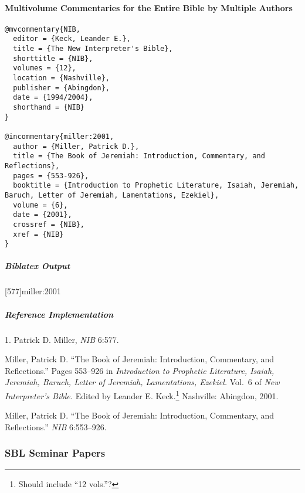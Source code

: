 \documentclass[a4paper]{article}
\newenvironment{biboutput}{%
  \subparagraph{Biblatex Output}
}{\color{black}}
\newenvironment{refimp}{%
  \subparagraph{Reference Implementation}
  \color{reference-colour}
  \rm
}{\par\color{black}}
\begin{document}
\paragraph{Multivolume Commentaries for the Entire Bible by Multiple Authors}

\begin{lstlisting}
@mvcommentary{NIB,
  editor = {Keck, Leander E.},
  title = {The New Interpreter's Bible},
  shorttitle = {NIB},
  volumes = {12},
  location = {Nashville},
  publisher = {Abingdon},
  date = {1994/2004},
  shorthand = {NIB}
}

@incommentary{miller:2001,
  author = {Miller, Patrick D.},
  title = {The Book of Jeremiah: Introduction, Commentary, and Reflections},
  pages = {553-926},
  booktitle = {Introduction to Prophetic Literature, Isaiah, Jeremiah, Baruch, Letter of Jeremiah, Lamentations, Ezekiel},
  volume = {6},
  date = {2001},
  crossref = {NIB},
  xref = {NIB}
}
\end{lstlisting}

\begin{biboutput}
  [577]{miller:2001}
  \toggletrue{fullbibrefs}
  \togglefalse{fullbibrefs}
\end{biboutput}

\begin{refimp}
  \hspace*{\bibindent}1. Patrick D. Miller, \emph{NIB} 6:577.

  \hangindent\bibindent Miller, Patrick D. “The Book of Jeremiah:
  Introduction, Commentary, and Reflections.” Pages 553–926 in
  \emph{Introduction to Prophetic Literature, Isaiah, Jeremiah, Baruch, Letter
  of Jeremiah, Lamentations, Ezekiel.} Vol.~6 of \emph{New Interpreter’s
  Bible.} Edited by Leander E. Keck.\footnote{Should include “12 vols.”?}
  Nashville: Abingdon, 2001.

  \hangindent\bibindent Miller, Patrick D. “The Book of Jeremiah:
  Introduction, Commentary, and Reflections.” \emph{NIB} 6:553–926.

\end{refimp}

\subsubsection{SBL Seminar Papers}
\end{document}
